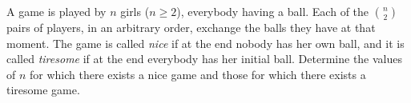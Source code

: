 A game is played by $n$ girls ($n \geq 2$), everybody having a ball. Each of the $\binom{n}{2}$ pairs of players, in an arbitrary order, exchange the balls they have at that moment. The game is called \emph{nice} if at the end nobody has her own ball, and it is called \emph{tiresome} if at the end everybody has her initial ball. Determine the values of $n$ for which there exists a nice game and those for which there exists a tiresome game.
